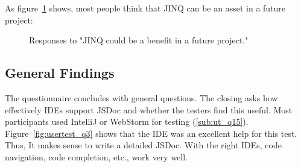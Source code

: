 As figure~\ref{fig:usertest_q2} shows, most people think that JINQ can be an
asset in a future project:
\begin{figure}[H]
\centering
{}
\caption{Responses to "JINQ could be a benefit in a future project."}
\label{fig:usertest_q2}
\end{figure}

\subsection{General Findings} %
\label{sub:General Findings}
The questionnaire concludes with general questions. The closing asks how
effectively IDEs support JSDoc and whether the testers find this useful. Most
participants used IntelliJ or WebStorm for testing (\ref{sub:ut_q15}).
Figure~\ref{fig:usertest_q3} shows that the IDE was an excellent help for this
test. Thus, It makes sense to write a detailed JSDoc. With the right IDEs, code
navigation, code completion, etc., work very well.

